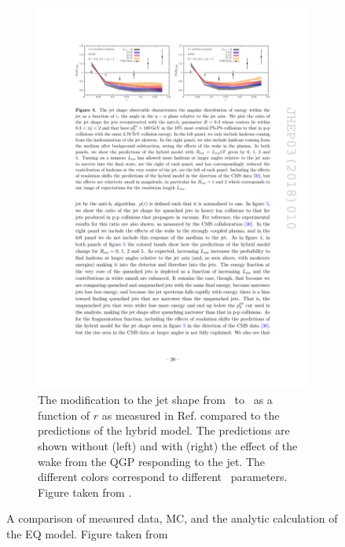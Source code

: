 \begin{figure}
\begin{subfigure}{1\textwidth}
\includegraphics[width=1\textwidth]{figures/jetMeasurements/HM_jetShape}
\caption{The modification to the jet shape from \pp\ to \pbpb\ as a function of $r$ as measured in Ref.
\cite{Chatrchyan:2013kwa} compared to the predictions of the hybrid model.
The predictions are shown without (left) and with (right) the effect of the wake from the QGP responding to the jet.
The different colors correspond to different \Lres\ parameters.
Figure taken from \cite{Hulcher:2017cpt}.}
\label{fig:hm_jetshape}
\end{subfigure}
\caption{A comparison of measured data, MC, and the analytic calculation of the EQ model.
Figure taken from \cite{Spousta:2015fca}}
\label{fig:HM_modification}
\end{figure}


